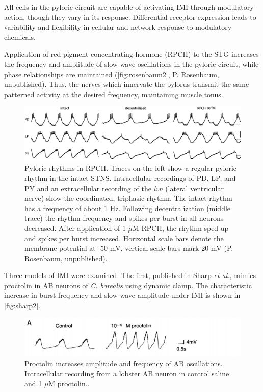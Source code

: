 All cells in the pyloric circuit are capable of activating \acs{IMI} through modulatory action, though they vary in its response. Differential receptor expression leads to variability and flexibility in cellular and network response to modulatory chemicals\autocite{SchulzVariablechannelexpression2006,OLearyCorrelationsionchannel2013}.

Application of red-pigment concentrating hormone (\acs{RPCH}) to the \acs{STG} increases the frequency and amplitude of slow-wave oscillations in the pyloric circuit, while phase relationships are maintained\autocite{NusbaumNeuronalRoleCrustacean1988} (\autoref{fig:rosenbaum2}, P. Rosenbaum, unpublished). Thus, the nerves which innervate the pylorus transmit the same patterned activity at the desired frequency, maintaining muscle tonus. 

\begin{figure}[h]
	\centering
	\includegraphics[width=1\linewidth]{gfx/Rosenbaum2}
	\caption[Pyloric Rhythms in \acs{RPCH}]{Pyloric rhythms in \acs{RPCH}. Traces on the left show a regular pyloric rhythm in the intact \acs{STNS}. Intracellular recordings of \acs{PD}, \acs{LP}, and \acs{PY} and an extracellular recording of the \textit{lvn} (lateral ventricular nerve) show the coordinated, triphasic rhythm. The intact rhythm has a frequency of about 1 Hz. Following decentralization (middle trace) the rhythm frequency and spikes per burst in all neurons decreased. After application of 1 $\mu \mathrm{M}$ \acs{RPCH}, the rhythm sped up and spikes per burst increased. Horizontal scale bars denote the membrane potential at -50 mV, vertical scale bars mark 20 mV (P. Rosenbaum, unpublished).}
	\label{fig:rosenbaum2}
\end{figure}

Three models of \acs{IMI} were examined. The first, published in Sharp \textit{et al.}, mimics proctolin in \acs{AB} neurons of \textit{C. borealis} using dynamic clamp\autocite{SharpDynamicclampcomputergenerated1993}. The characteristic increase in burst frequency and slow-wave amplitude under \acs{IMI} is shown in \autoref{fig:sharp2}.

\begin{figure}[h]
	\centering
	\includegraphics[width=1\linewidth]{gfx/Sharp2}
	\caption[Proctolin on AB neurons]{Proctolin increases amplitude and frequency of \acs{AB} oscillations. Intracellular recording from a lobster \acs{AB} neuron in control saline and 1 $\mu \mathrm{M}$ proctolin.\autocite{SharpDynamicclampcomputergenerated1993}.}
	\label{fig:sharp2}
\end{figure}



